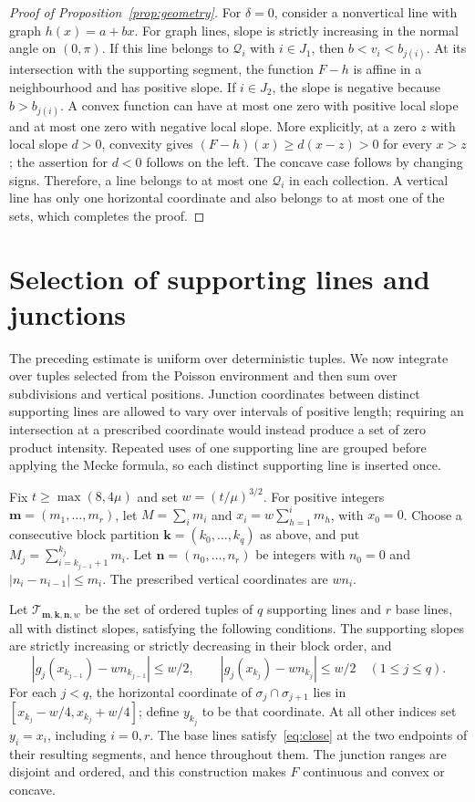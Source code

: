 \documentclass[11pt,letterpaper]{article}
\begin{document}
\begin{proof}[Proof of Proposition~\ref{prop:geometry}]
For $\delta=0$, consider a nonvertical line with graph $h(x)=a+bx$. For graph lines, slope is strictly increasing in the normal angle on $(0,\pi)$. If this line belongs to $\mathscr Q_i$ with $i\in J_1$, then $b<v_i<b_{j(i)}$. At its intersection with the supporting segment, the function $F-h$ is affine in a neighbourhood and has positive slope. If $i\in J_2$, the slope is negative because $b>b_{j(i)}$. A convex function can have at most one zero with positive local slope and at most one zero with negative local slope. More explicitly, at a zero $z$ with local slope $d>0$, convexity gives $(F-h)(x)\ge d(x-z)>0$ for every $x>z$; the assertion for $d<0$ follows on the left. The concave case follows by changing signs. Therefore, a line belongs to at most one $\mathscr Q_i$ in each collection. A vertical line has only one horizontal coordinate and also belongs to at most one of the sets, which completes the proof.
\end{proof}

\section{Selection of supporting lines and junctions}

The preceding estimate is uniform over deterministic tuples. We now integrate over tuples selected from the Poisson environment and then sum over subdivisions and vertical positions. Junction coordinates between distinct supporting lines are allowed to vary over intervals of positive length; requiring an intersection at a prescribed coordinate would instead produce a set of zero product intensity. Repeated uses of one supporting line are grouped before applying the Mecke formula, so each distinct supporting line is inserted once.

Fix $t\ge\max(8,4\mu)$ and set $w=(t/\mu)^{3/2}$. For positive integers $\boldsymbol m=(m_1,\ldots,m_r)$, let $M=\sum_i m_i$ and $x_i=w\sum_{h=1}^i m_h$, with $x_0=0$. Choose a consecutive block partition $\boldsymbol k=(k_0,\ldots,k_q)$ as above, and put $M_j=\sum_{i=k_{j-1}+1}^{k_j}m_i$. Let $\boldsymbol n=(n_0,\ldots,n_r)$ be integers with $n_0=0$ and $|n_i-n_{i-1}|\le m_i$. The prescribed vertical coordinates are $wn_i$.

Let $\mathcal T_{\boldsymbol m,\boldsymbol k,\boldsymbol n,w}$ be the set of ordered tuples of $q$ supporting lines and $r$ base lines, all with distinct slopes, satisfying the following conditions. The supporting slopes are strictly increasing or strictly decreasing in their block order, and
\begin{equation}\label{eq:anchors}
 |g_j(x_{k_{j-1}})-wn_{k_{j-1}}|\le w/2,\qquad
 |g_j(x_{k_j})-wn_{k_j}|\le w/2\quad(1\le j\le q).
\end{equation}
For each $j<q$, the horizontal coordinate of $\sigma_j\cap\sigma_{j+1}$ lies in $[x_{k_j}-w/4,x_{k_j}+w/4]$; define $y_{k_j}$ to be that coordinate. At all other indices set $y_i=x_i$, including $i=0,r$. The base lines satisfy~\eqref{eq:close} at the two endpoints of their resulting segments, and hence throughout them. The junction ranges are disjoint and ordered, and this construction makes $F$ continuous and convex or concave.
\end{document}
